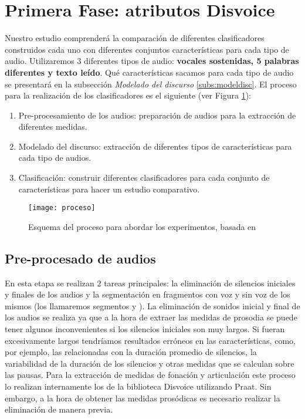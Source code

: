 \section{Primera Fase: atributos Disvoice}
Nuestro estudio comprenderá la comparación de diferentes clasificadores construidos cada uno con diferentes conjuntos características para cada tipo de audio. Utilizaremos 3 diferentes tipos de audio: \textbf{vocales sostenidas, 5 palabras diferentes y texto leído}. Qué características sacamos para cada tipo de audio se presentará en la subsección \textit{Modelado del discurso} \ref{subs:modeldisc}. El proceso para la realización de los clasificadores es el siguiente (ver Figura \ref{fig:proceso}):
\begin{enumerate}
\item Pre-procesamiento de los audios: preparación de audios para la extracción de diferentes medidas.
\item Modelado del discurso: extracción de diferentes tipos de características para cada tipo de audios.
\item Clasificación: construir diferentes clasificadores para cada conjunto de características para hacer un estudio comparativo.
\end{enumerate}

\begin{figure}[!h]
		\centering
		\texttt{[image: proceso]}
		\caption[Esquema del proceso para abordar los experimentos.]{Esquema del proceso para abordar los experimentos, basada en \cite{Orz2016}}\label{fig:proceso}
\end{figure}

\subsection{Pre-procesado de audios}
En esta etapa se realizan 2 tareas principales: la eliminación de silencios iniciales y finales de los audios y la segmentación en fragmentos con voz y sin voz de los mismos (los llamaremos segmentos  y ).
La eliminación de sonidos inicial y final de los audios se realiza ya que a la hora de extraer las medidas de prosodia se puede tener algunos inconvenientes si los silencios iniciales son muy largos. Si fueran excesivamente largos tendríamos resultados erróneos en las características, como, por ejemplo, las relacionadas con la duración promedio de silencios, la variabilidad de la duración de los silencios y otras medidas que se calculan sobre las pausas.
Para la extracción de medidas de fonación y articulación este proceso lo realizan internamente los  de la biblioteca Disvoice \cite{neurospeech} utilizando Praat. Sin embargo, a la hora de obtener las medidas prosódicas es necesario realizar la eliminación de manera previa.


